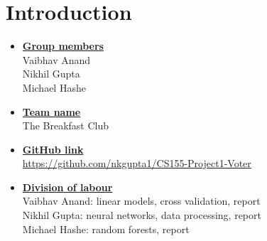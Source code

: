 \newif\ifshowsolutions
\showsolutionstrue

\newcommand{\boldline}[1]{\underline{\textbf{#1}}}


\usepackage{amsfonts} %
\usepackage{amsmath} %
\usepackage{longtable} %
\usepackage{enumitem}
\usepackage{graphicx} %
\graphicspath{{figures/}} %
\usepackage{makecell}



\pagestyle{fancy}


\section{Introduction}
\medskip
\begin{itemize}

    \item \boldline{Group members} \\
    Vaibhav Anand \\
    Nikhil Gupta \\
    Michael Hashe
    
    \item \boldline{Team name} \\
    The Breakfast Club

    \item \boldline{GitHub link} \\
    \href{https://github.com/nkgupta1/CS155-Project1-Voter}{https://github.com/nkgupta1/CS155-Project1-Voter}
    
    \item \boldline{Division of labour} \\
    Vaibhav Anand: linear models, cross validation, report \\
    Nikhil Gupta: neural networks, data processing, report \\
    Michael Hashe: random forests, report

\end{itemize}



